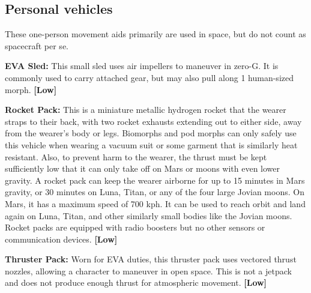 \subsection{Personal vehicles} \label{sec:personal-vehicles} 

These one-person movement aids primarily are used in space, but do not count as spacecraft per se. 

\textbf{EVA Sled:} This small sled uses air impellers to maneuver in zero-G. It is commonly used to carry attached gear, but may also pull along 1 human-sized morph. \textbf{[Low]} 

\textbf{Rocket Pack:} This is a miniature metallic hydrogen rocket that the wearer straps to their back, with two rocket exhausts extending out to either side, away from the wearer’s body or legs. Biomorphs and pod morphs can only safely use this vehicle when wearing a vacuum suit or some garment that is similarly heat resistant. Also, to prevent harm to the wearer, the thrust must be kept sufficiently low that it can only take off on Mars or moons with even lower gravity. A rocket pack can keep the wearer airborne for up to 15 minutes in Mars gravity, or 30 minutes on Luna, Titan, or any of the four large Jovian moons. On Mars, it has a maximum speed of 700 kph. It can be used to reach orbit and land again on Luna, Titan, and other similarly small bodies like the Jovian moons. Rocket packs are equipped with radio boosters but no other sensors or communication devices. \textbf{[Low]} 

\textbf{Thruster Pack:} Worn for EVA duties, this thruster pack uses vectored thrust nozzles, allowing a character to maneuver in open space. This is not a jetpack and does not produce enough thrust for atmospheric movement. \textbf{[Low]} 

